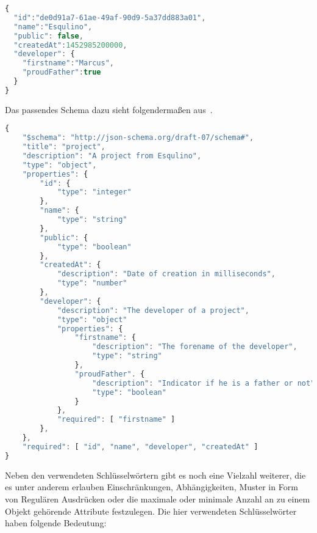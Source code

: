 \begin{lstlisting}[language=Javascript,float=h!,caption={Ein Projekt als JSON Objekt}, label={fig:basics:jsonschema:1}]
{
  "id":"de0d91a7-61ae-49af-90d9-5a37dd883a01",
  "name":"Esqulino",
  "public": false,
  "createdAt":1452985200000,
  "developer": {
    "firstname":"Marcus",
    "proudFather":true
  }
}
\end{lstlisting}

Das passendes Schema dazu sieht folgendermaßen aus~.

\begin{lstlisting}[language=Javascript,float=h!,caption={JSON Schema zu Projekt Objekt}, label={fig:basics:jsonschema:2}]
{
    "$schema": "http://json-schema.org/draft-07/schema#",
    "title": "project",
    "description": "A project from Esqulino",
    "type": "object",
    "properties": {
        "id": {
            "type": "integer"
        },
        "name": {
            "type": "string"
        },
        "public": {
            "type": "boolean"
        },
        "createdAt": {
            "description": "Date of creation in milliseconds",
            "type": "number"
        },
        "developer": {
            "description": "The developer of a project",
            "type": "object"
            "properties": {
                "firstname": {
                    "description": "The forename of the developer",
                    "type": "string"
                },
                "proudFather". {
                    "description": "Indicator if he is a father or not",
                    "type": "boolean"
                }
            },
            "required": [ "firstname" ]
        },
    },
    "required": [ "id", "name", "developer", "createdAt" ]
}
\end{lstlisting}

Neben den verwendeten Schlüsselwörtern gibt es noch eine Vielzahl weiterer, die es unter anderem erlauben Einschränkungen, Abhängigkeiten,
Muster in Form von Regulären Ausdrücken oder die maximale oder minimale Anzahl an zu einem Objekt gehörende Attribute festzulegen.
Die hier verwendeten Schlüsselwörter haben folgende Bedeutung:

